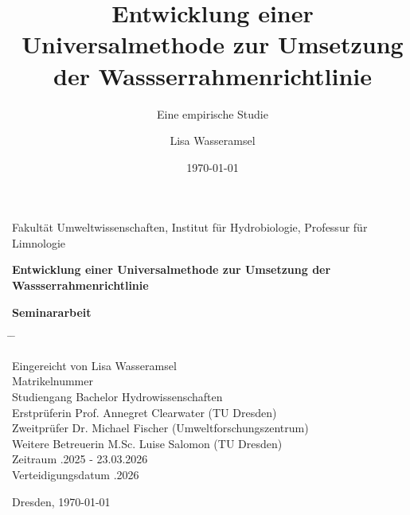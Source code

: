 \documentclass[fontsize=12pt,BCOR=12mm,logo/language=de]{tudcdreprt}
\title{Entwicklung einer Universalmethode zur Umsetzung der Wassserrahmenrichtlinie}
\subtitle{Eine empirische Studie}
\author{Lisa Wasseramsel}
\date{\today}
\begin{document}
\pagestyle{empty}

\begin{tudcdtitlepage}

\vspace{-1.8cm}
Fakultät Umweltwissenschaften, Institut für Hydrobiologie, Professur für Limnologie

\vspace*{4cm}

\textbf{\huge{Entwicklung einer Universalmethode zur Umsetzung der Wassserrahmenrichtlinie}}

\vspace{1cm}

\textbf{\LARGE{Seminararbeit}}



\vspace{6cm} %

\begin{tabbing}
	\hspace{0cm} \= \hspace{4cm} \= \kill

	\> Eingereicht von \> Lisa Wasseramsel\\
  \> Matrikelnummer \\
  \> Studiengang \> Bachelor Hydrowissenschaften\\
	\> Erstprüferin \> Prof. Annegret Clearwater (TU Dresden)\\
	\> Zweitprüfer \> Dr. Michael Fischer (Umweltforschungszentrum)\\
	\> Weitere Betreuerin \> M.Sc. Luise Salomon (TU Dresden)\\
	\> Zeitraum .2025 - 23.03.2026\\
	\> Verteidigungsdatum .2026 

\end{tabbing}

\vspace{1cm}

Dresden, \today %

\end{tudcdtitlepage}%
\end{document}

